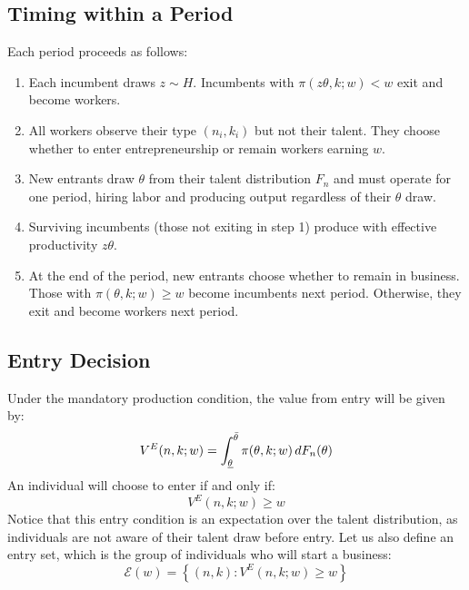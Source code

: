 \subsection{Timing within a Period}

Each period proceeds as follows:
\begin{enumerate}[1)]
\item Each incumbent draws $z \sim H$. Incumbents with $\pi(z\theta, k; w) < w$ exit and become workers.

\item All workers observe their type $(n_i, k_i)$ but not their talent. They choose whether to enter entrepreneurship or remain workers earning $w$.

\item New entrants draw $\theta$ from their talent distribution $F_{n}$ and must operate for one period, hiring labor and producing output regardless of their $\theta$ draw.

\item Surviving incumbents (those not exiting in step 1) produce with effective productivity $z\theta$.

\item   At the end of the period, new entrants choose whether to remain in business. Those with $\pi(\theta, k; w) \geq w$ become incumbents next period. Otherwise, they exit and become workers next period.
\end{enumerate}
\subsection{Entry Decision}

    Under the mandatory production condition, the value from entry will be given by:
    \begin{equation}
        V^E(n,k;w) = \int_{\underline{\theta}}^{\Bar{\theta}}  \pi(\theta, k; w) \, dF_{n}(\theta) 
    \end{equation}
    An individual will choose to enter if and only if:
    \begin{equation}
        V^E(n,k;w) \geq w
    \end{equation}
    Notice that this entry condition is an expectation over the talent distribution, as individuals are not aware of their talent draw before entry. Let us also define an entry set, which is the group of individuals who will start a business:
    \begin{equation}
\mathcal{E}(w) = \left\{ (n, k) : V^E(n,k;w)\geq w \right\}
\end{equation}

